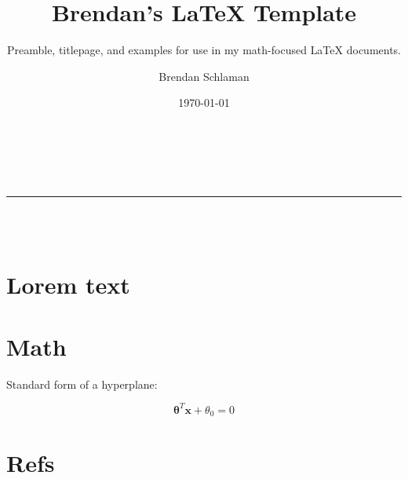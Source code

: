 \documentclass[titlepage]{article}
\title{\bfseries Brendan's {\LaTeX} Template}
\subtitle{
    Preamble, titlepage, and examples for use in my math-focused {\LaTeX} documents.
}
\author{Brendan Schlaman}
\date{\today}
\begin{document}
\begin{titlepage}
    \centering
    \vspace*{2in}

    {\LARGE \thetitle}\\[2ex]
    {\small \thesubtitle}\\[2ex]
    \rule{\textwidth}{1pt}\\[8ex]
    {\Large \theauthor}\\[2ex]
    {\thedate}
\end{titlepage}

\tableofcontents
\newpage


\section{Lorem text}

\lipsum[1-2]

\section{Math}
\label{sec:SectionToReference}

Standard form of a hyperplane:

\begin{equation}
    \label{eq:MyEquation}
    \boldsymbol{\theta}^T \mathbf{x} + \theta_0 = 0
\end{equation}

\section{Refs}
\end{document}
